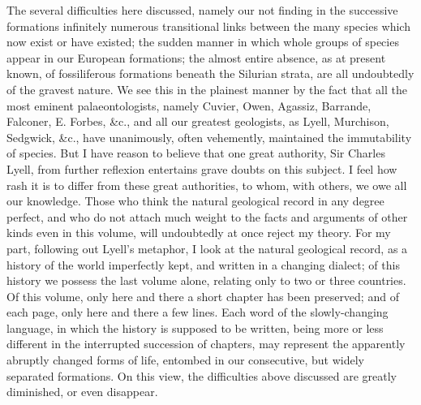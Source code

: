 \indent The several difficulties here discussed, namely our not finding in the successive formations infinitely numerous transitional links between the many species which now exist or have existed; the sudden manner in which whole groups of species appear in our European formations; the almost entire absence, as at present known, of fossiliferous formations beneath the Silurian strata, are all undoubtedly of the gravest nature. We see this in the plainest manner by the fact that all the most eminent palaeontologists, namely Cuvier, Owen, Agassiz, Barrande, Falconer, E. Forbes, \&c., and all our greatest geologists, as Lyell, Murchison, Sedgwick, \&c., have unanimously, often vehemently, maintained the immutability of species. But I have reason to believe that one great authority, Sir Charles Lyell, from further reflexion entertains grave doubts on this subject. I feel how rash it is to differ from these great authorities, to whom, with others, we owe all our knowledge. Those who think the natural geological record in any degree perfect, and who do not attach much weight to the facts and arguments of other kinds even in this volume, will undoubtedly at once reject my theory. For my part, following out Lyell's metaphor, I look at the natural geological record, as a history of the world imperfectly kept, and written in a changing dialect; of this history we possess the last volume alone, relating only to two or three countries. Of this volume, only here and there a short chapter has been preserved; and of each page, only here and there a few lines.  Each word of the slowly-changing language, in which the history is supposed to be written, being more or less different in the interrupted succession of chapters, may represent the apparently abruptly changed forms of life, entombed in our consecutive, but widely separated formations. On this view, the difficulties above discussed are greatly diminished, or even disappear.\\